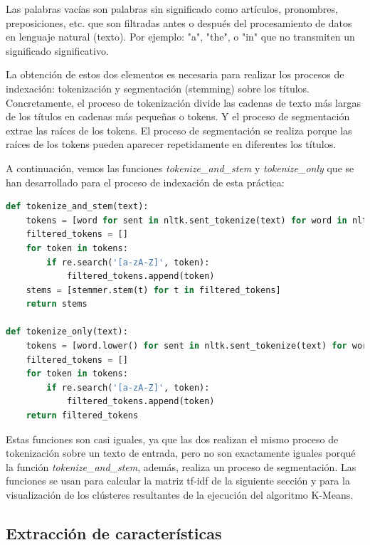 \documentclass{uimppracticas}
\begin{document}
\begin{definition}\label{palabras_vacías}
	Las palabras vacías son palabras sin significado como artículos, pronombres, preposiciones, etc. que son filtradas antes o después del procesamiento de datos en lenguaje natural (texto). Por ejemplo: "a", "the", o "in" que no transmiten un significado significativo.
\end{definition}

La obtención de estos dos elementos es necesaria para realizar los procesos de indexación: tokenización y segmentación (stemming) sobre los títulos. Concretamente, el proceso de tokenización divide las cadenas de texto más largas de los títulos en cadenas más pequeñas o tokens. Y el proceso de segmentación extrae las raíces de los tokens. El proceso de segmentación se realiza porque las raíces de los tokens pueden aparecer repetidamente en diferentes los títulos.

A continuación, vemos las funciones \textit{tokenize\_and\_stem} y \textit{tokenize\_only} que se han desarrollado para el proceso de indexación de esta práctica: 

\begin{lstlisting}[language=python]
def tokenize_and_stem(text):
	tokens = [word for sent in nltk.sent_tokenize(text) for word in nltk.word_tokenize(sent)]
	filtered_tokens = []
	for token in tokens:
		if re.search('[a-zA-Z]', token):
			filtered_tokens.append(token)
	stems = [stemmer.stem(t) for t in filtered_tokens]
	return stems

def tokenize_only(text):
	tokens = [word.lower() for sent in nltk.sent_tokenize(text) for word in nltk.word_tokenize(sent)]
	filtered_tokens = []
	for token in tokens:
		if re.search('[a-zA-Z]', token):
			filtered_tokens.append(token)
	return filtered_tokens  
\end{lstlisting}

Estas funciones son casi iguales, ya que las dos realizan el mismo proceso de tokenización sobre un texto de entrada, pero no son exactamente iguales porqué la función \textit{tokenize\_and\_stem}, además, realiza un proceso de segmentación. Las funciones se usan para calcular la matriz tf-idf de la siguiente sección y para la visualización de los clústeres resultantes de la ejecución del algoritmo K-Means.

\newpage 

\subsection{Extracción de características}\label{características}
\end{document}
